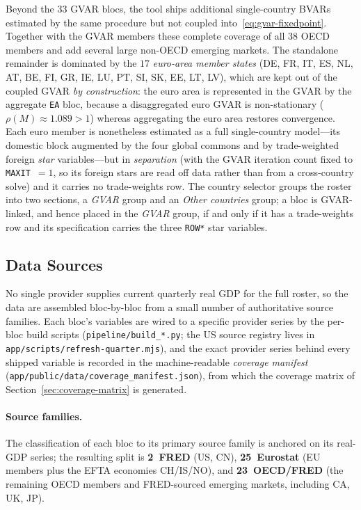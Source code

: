 \documentclass[11pt]{article}
\theoremstyle{definition}
\theoremstyle{remark}
\begin{document}
Beyond the 33 GVAR blocs, the tool ships additional single-country BVARs
estimated by the same procedure but not coupled into~\eqref{eq:gvar-fixedpoint}.
Together with the GVAR members these complete coverage of all 38 OECD
members and add several large non-OECD emerging markets. The standalone
remainder is dominated by the $17$ \emph{euro-area member states} (DE, FR, IT,
ES, NL, AT, BE, FI, GR, IE, LU, PT, SI, SK, EE, LT, LV), which are kept out of
the coupled GVAR \emph{by construction}: the euro area is represented in the
GVAR by the aggregate \texttt{EA} bloc, because a disaggregated euro GVAR is
non-stationary ($\rho(M)\approx 1.089 > 1$) whereas aggregating the euro area
restores convergence. Each euro member is nonetheless estimated as a full
single-country model---its domestic block augmented by the four global commons
and by trade-weighted foreign \emph{star} variables---but in \emph{separation}
(with the GVAR iteration count fixed to \texttt{MAXIT}~$=1$, so its foreign
stars are read off data rather than from a cross-country solve) and it carries no
trade-weights row. The country selector groups the roster into two sections, a
\emph{GVAR} group and an \emph{Other countries} group; a bloc is GVAR-linked, and
hence placed in the \emph{GVAR} group, if and only if it has a trade-weights row
and its specification carries the three \texttt{ROW*} star variables.

\subsection{Data Sources}\label{sec:datasources}

No single provider supplies current quarterly real GDP for the full
roster, so the data are assembled bloc-by-bloc from a small number of
authoritative source families. Each bloc's variables are wired to a
specific provider series by the per-bloc build scripts
(\texttt{pipeline/build\_*.py}; the US source registry lives in
\texttt{app/scripts/refresh-quarter.mjs}), and the exact provider series
behind every shipped variable is recorded in the machine-readable
\emph{coverage manifest} (\texttt{app/public/data/coverage\_manifest.json}),
from which the coverage matrix of Section~\ref{sec:coverage-matrix} is
generated.

\paragraph{Source families.} The classification of each bloc to its
primary source family is anchored on its real-GDP series; the resulting
split is \textbf{2~FRED} (US, CN), \textbf{25~Eurostat} (EU members plus
the EFTA economies CH/IS/NO), and \textbf{23~OECD/FRED} (the remaining
OECD members and FRED-sourced emerging markets, including CA, UK, JP).
\end{document}
